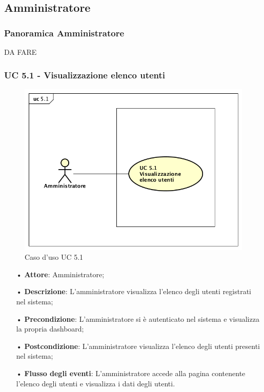 \subsection{Amministratore}
\subsubsection{Panoramica Amministratore}
DA FARE

\subsubsection{UC 5.1 - Visualizzazione elenco utenti}

\begin{figure}[H]
\centering
\includegraphics[width=17cm]{img/UC51.png} 
\caption{Caso d'uso UC 5.1}
\end{figure}


\begin{itemize}
\item[•] \textbf{Attore}: Amministratore;

\item[•] \textbf{Descrizione}: L'amministratore visualizza l'elenco degli utenti registrati nel sistema;

\item[•] \textbf{Precondizione}: L'amministratore si è autenticato nel sistema e visualizza la propria dashboard;

\item[•] \textbf{Postcondizione}: L'amministratore visualizza l'elenco degli utenti presenti nel sistema;

\item[•] \textbf{Flusso degli eventi}: L'amministratore accede alla pagina contenente l'elenco degli utenti e visualizza i dati degli utenti. 
\end{itemize}

